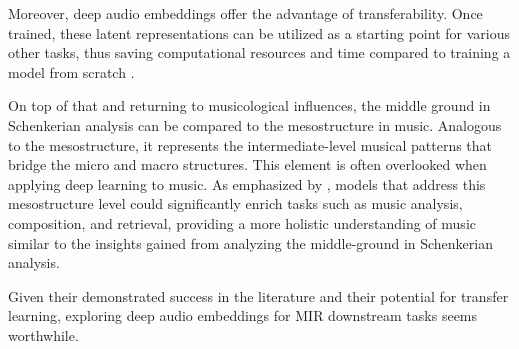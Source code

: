 Moreover, deep audio embeddings offer the advantage of transferability. Once trained, these latent representations can be utilized as a starting point for various other tasks, thus saving computational resources and time compared to training a model from scratch \cite{HamelTransferSimilarity}.

On top of that and returning to musicological influences, the middle ground in Schenkerian analysis can be compared to the mesostructure in music. Analogous to the mesostructure, it represents the intermediate-level musical patterns that bridge the micro and macro structures. This element is often overlooked when applying deep learning to music. As emphasized by \cite{Mesostructures2023}, models that address this mesostructure level could significantly enrich tasks such as music analysis, composition, and retrieval, providing a more holistic understanding of music similar to the insights gained from analyzing the middle-ground in Schenkerian analysis. \cite{Introduction_to_Schenkerian_Analysis}

Given their demonstrated success in the literature and their potential for transfer learning, exploring deep audio embeddings for MIR downstream tasks seems worthwhile.
